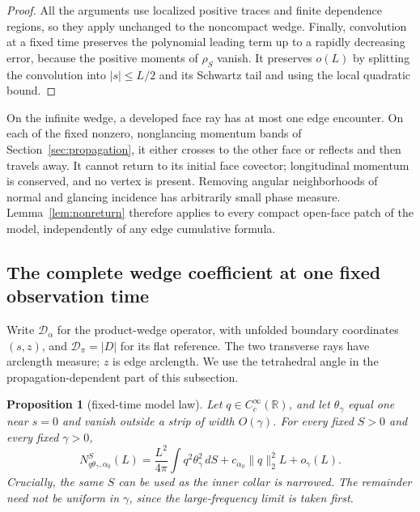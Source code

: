 \documentclass[11pt]{amsart}
\numberwithin{equation}{section}
\newtheorem{proposition}[theorem]{Proposition}
\theoremstyle{remark}
\newcommand{\R}{\mathbb{R}}
\newcommand{\Dcal}{\mathcal{D}}
\begin{document}
\begin{proof}
All the arguments use localized positive traces and finite dependence regions, so they apply unchanged to the noncompact wedge. Finally, convolution at a fixed time preserves the polynomial leading term up to a rapidly decreasing error, because the positive moments of $\rho_S$ vanish. It preserves $o(L)$ by splitting the convolution into $|s|\le L/2$ and its Schwartz tail and using the local quadratic bound.
\end{proof}

On the infinite wedge, a developed face ray has at most one edge encounter. On each of the fixed nonzero, nonglancing momentum bands of Section~\ref{sec:propagation}, it either crosses to the other face or reflects and then travels away. It cannot return to its initial face covector; longitudinal momentum is conserved, and no vertex is present. Removing angular neighborhoods of normal and glancing incidence has arbitrarily small phase measure. Lemma~\ref{lem:nonreturn} therefore applies to every compact open-face patch of the model, independently of any edge cumulative formula.

\subsection{The complete wedge coefficient at one fixed observation time}
Write $\Dcal_\alpha$ for the product-wedge operator, with unfolded boundary coordinates $(s,z)$, and $\Dcal_\pi=|D|$ for its flat reference. The two transverse rays have arclength measure; $z$ is edge arclength. We use the tetrahedral angle in the propagation-dependent part of this subsection.

\begin{proposition}[fixed-time model law]\label{prop:modellaw}
Let $q\in C_c^\infty(\R)$, and let $\theta_\gamma$ equal one near $s=0$ and vanish outside a strip of width $O(\gamma)$. For every fixed $S>0$ and every fixed $\gamma>0$,
\begin{equation}\label{eq:modellaw}
N^S_{q\theta_\gamma,\alpha_0}(L)=\frac{L^2}{4\pi}\int q^2\theta_\gamma^2\,dS+c_{\alpha_0}\|q\|_2^2L+o_\gamma(L) .
\end{equation}
Crucially, the same $S$ can be used as the inner collar is narrowed. The remainder need not be uniform in $\gamma$, since the large-frequency limit is taken first.
\end{proposition}
\end{document}
